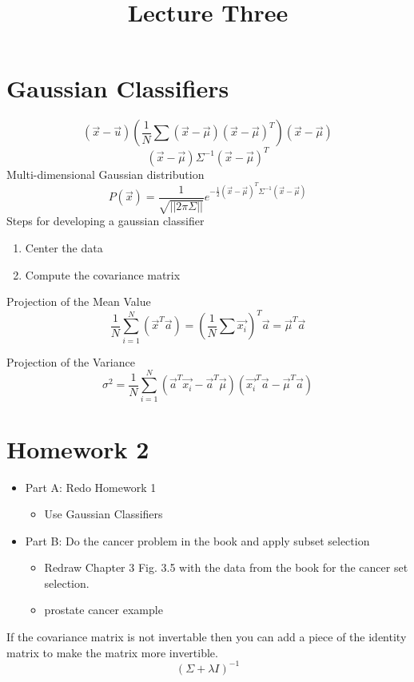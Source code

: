 \documentclass[letter, 9pt]{article}
\title{Lecture Three}
\begin{document}
\maketitle
\section{Gaussian Classifiers}
\begin{equation}
(\vec{x} - \vec{u})(\frac{1}{N} \sum(\vec{x} - \vec{\mu})(\vec{x} - \vec{\mu})^T)(\vec{x} - \vec{\mu})
\end{equation}
\begin{equation}
(\vec{x} - \vec{\mu})\Sigma^{-1}(\vec{x} - \vec{\mu})^T
\end{equation}
Multi-dimensional Gaussian distribution
\begin{equation}
P(\vec{x}) = \frac{1}{\sqrt{||2 \pi \Sigma ||}}e^{-\frac{1}{2}(\vec{x} - \vec{\mu})^T \Sigma^{-1}(\vec{x} - \vec{\mu})}
\end{equation}
Steps for developing a gaussian classifier
\begin{enumerate}
\item Center the data
\item Compute the covariance matrix
\end{enumerate}
Projection of the Mean Value
\begin{equation}
\frac{1}{N}\sum^N_{i=1}(\vec{x}^T \vec{a}) = (\frac{1}{N} \sum \vec{x_i})^T \vec{a} = \vec{\mu}^T \vec{a}
\end{equation}

Projection of the Variance
\begin{equation}
\sigma^2 = \frac{1}{N} \sum^{N}_{i=1} (\vec{a}^T\vec{x_i} - \vec{a}^T \vec{\mu})(\vec{x_i}^T\vec{a} - \vec{\mu}^T\vec{a})
\end{equation}

\section{Homework 2}
\begin{itemize}
\item Part A: Redo Homework 1
\begin{itemize}
\item Use Gaussian Classifiers
\end{itemize}
\item Part B: Do the cancer problem in the book and apply subset selection
\begin{itemize}
\item Redraw Chapter 3 Fig. 3.5 with the data from the book for the cancer set selection.
\item prostate cancer example
\end{itemize}
\end{itemize}

If the covariance matrix is not invertable then you can add a piece of the identity matrix to make the matrix more invertible.
\begin{equation}
(\Sigma + \lambda I)^{-1}
\end{equation}
\end{document}
